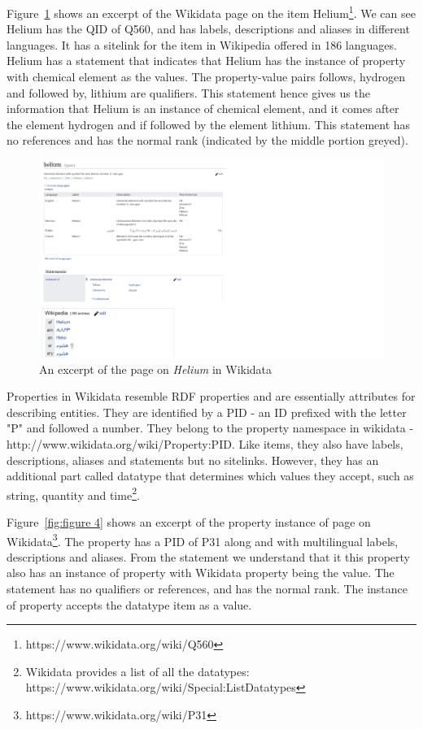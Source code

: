 \documentclass[12 pt, a4paper]{report}
\theoremstyle{definition}
\begin{document}
Figure~\ref{fig:figure 3} shows an excerpt of the Wikidata page on the item Helium\footnote{https://www.wikidata.org/wiki/Q560}. We can see Helium has the QID of Q560, and has labels, descriptions and aliases in different languages. It has a sitelink for the item in Wikipedia offered in 186 languages. Helium has a statement that indicates that Helium has the instance of property with chemical element as the values. The property-value pairs follows, hydrogen and followed by, lithium are qualifiers. This statement hence gives us the information that Helium is an instance of chemical element, and it comes after the element hydrogen and if followed by the element lithium. This statement has no references and has the normal rank (indicated by the middle portion greyed).

\begin{figure}[h]
  \centering
  \includegraphics[width=0.75 \linewidth]{images/helium.pdf}
  \caption{An excerpt of the page on \textit{Helium} in Wikidata}
  \label{fig:figure 3}
\end{figure}

Properties in Wikidata resemble RDF properties and are essentially attributes for describing entities. They are identified by a PID - an ID prefixed with the letter "P" and followed a number. They belong to the property namespace in wikidata - http://www.wikidata.org/wiki/Property:PID. Like items, they also have labels, descriptions, aliases and statements but no sitelinks. However, they has an additional part called datatype that determines which values they accept, such as string, quantity and time\footnote{Wikidata provides a list of all the datatypes: https://www.wikidata.org/wiki/Special:ListDatatypes}.

Figure~\ref{fig:figure 4} shows an excerpt of the property instance of page on Wikidata\footnote{https://www.wikidata.org/wiki/P31}. The property has a PID of P31 along and with multilingual labels, descriptions and aliases. From the statement we understand that it this property also has an instance of property with Wikidata property being the value. The statement has no qualifiers or references, and has the normal rank. The instance of property accepts the datatype item as a value.
\end{document}
